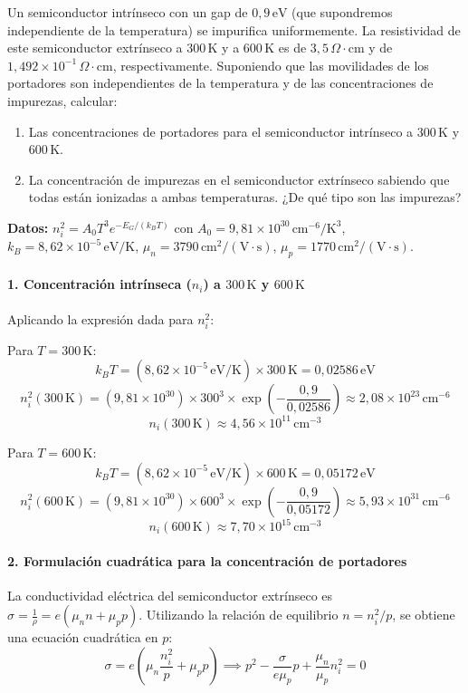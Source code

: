 \begin{problema}
Un semiconductor intrínseco con un gap de $0,9\,\text{eV}$ (que supondremos independiente de la temperatura) se impurifica uniformemente. La resistividad de este semiconductor extrínseco a $300\,\text{K}$ y a $600\,\text{K}$ es de $3,5\,\Omega\cdot\text{cm}$ y de $1,492 \times 10^{-1}\,\Omega\cdot\text{cm}$, respectivamente. Suponiendo que las movilidades de los portadores son independientes de la temperatura y de las concentraciones de impurezas, calcular:
\begin{enumerate}[label=\alph*)]
    \item Las concentraciones de portadores para el semiconductor intrínseco a $300\,\text{K}$ y $600\,\text{K}$.
    \item La concentración de impurezas en el semiconductor extrínseco sabiendo que todas están ionizadas a ambas temperaturas. ¿De qué tipo son las impurezas?
\end{enumerate}

\textbf{Datos:} $n_i^2 = A_0 T^3 e^{-E_G / (k_B T)}$ con $A_0 = 9,81 \times 10^{30}\,\text{cm}^{-6}/\text{K}^3$, $k_B = 8,62 \times 10^{-5}\,\text{eV/K}$, $\mu_n = 3790\,\text{cm}^2/(\text{V}\cdot\text{s})$, $\mu_p = 1770\,\text{cm}^2/(\text{V}\cdot\text{s})$.
\tcblower
\paragraph{1. Concentración intrínseca ($n_i$) a $300\,\text{K}$ y $600\,\text{K}$}
Aplicando la expresión dada para $n_i^2$:

Para $T = 300\,\text{K}$:
\[
k_B T = (8,62 \times 10^{-5}\,\text{eV/K}) \times 300\,\text{K} = 0,02586\,\text{eV}
\]
\[
n_i^2(300\,\text{K}) = (9,81 \times 10^{30}) \times 300^3 \times \exp\left(-\frac{0,9}{0,02586}\right) \approx 2,08 \times 10^{23}\,\text{cm}^{-6}
\]
\[
n_i(300\,\text{K}) \approx 4,56 \times 10^{11}\,\text{cm}^{-3}
\]

Para $T = 600\,\text{K}$:
\[
k_B T = (8,62 \times 10^{-5}\,\text{eV/K}) \times 600\,\text{K} = 0,05172\,\text{eV}
\]
\[
n_i^2(600\,\text{K}) = (9,81 \times 10^{30}) \times 600^3 \times \exp\left(-\frac{0,9}{0,05172}\right) \approx 5,93 \times 10^{31}\,\text{cm}^{-6}
\]
\[
n_i(600\,\text{K}) \approx 7,70 \times 10^{15}\,\text{cm}^{-3}
\]

\paragraph{2. Formulación cuadrática para la concentración de portadores}
La conductividad eléctrica del semiconductor extrínseco es $\sigma = \frac{1}{\rho} = e (\mu_n n + \mu_p p)$. Utilizando la relación de equilibrio $n = n_i^2 / p$, se obtiene una ecuación cuadrática en $p$:
\[
\sigma = e \left( \mu_n \frac{n_i^2}{p} + \mu_p p \right) \implies p^2 - \frac{\sigma}{e \mu_p} p + \frac{\mu_n}{\mu_p} n_i^2 = 0
\]


\end{problema}
